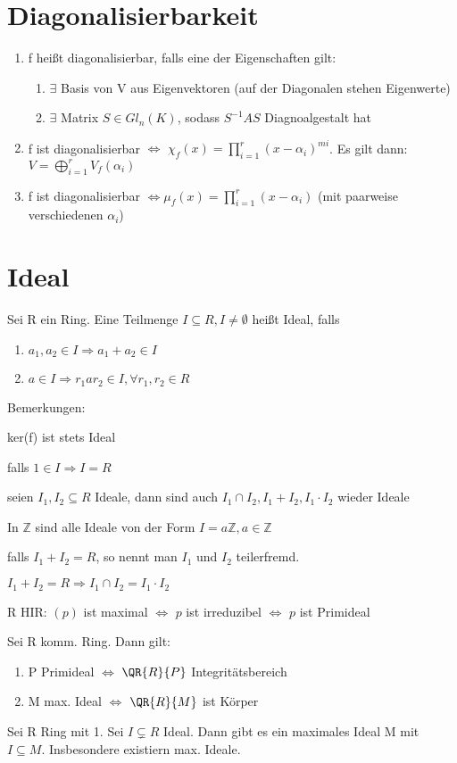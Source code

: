 \section{Diagonalisierbarkeit}
\begin{enumerate}
	\item f heißt diagonalisierbar, falls eine der Eigenschaften gilt:
	\begin{enumerate}
		\item $\exists$ Basis von V aus Eigenvektoren (auf der Diagonalen stehen Eigenwerte)
		\item $\exists$ Matrix $S \in Gl_n(K)$, sodass $S^{-1}AS$ Diagnoalgestalt hat
	\end{enumerate}
	\item f ist diagonalisierbar $\Leftrightarrow$ $\chi_f(x) = \prod \limits_{i=1}^{r} (x- \alpha_i)^{mi}$. Es gilt dann: $V=\bigoplus \limits_{i=1}^r V_f(\alpha_i)$
	\item f ist diagonalisierbar $\Leftrightarrow \mu_f(x) = \prod \limits_{i=1}^{r}(x-\alpha_i)$ (mit paarweise verschiedenen $\alpha_i$) 
\end{enumerate}

\section{Ideal}
Sei R ein Ring. Eine Teilmenge $I \subseteq R, I \neq \emptyset$ heißt Ideal, falls
\begin{enumerate}
	\item $a_1,a_2 \in I \Rightarrow a_1+a_2 \in I$
	\item $a \in I \Rightarrow r_1 a r_2 \in I, \forall r_1,r_2 \in R$
\end{enumerate}
Bemerkungen:
\begin{compactitem}
	\item ker(f) ist stets Ideal
	\item falls $1 \in I \Rightarrow I = R$
	\item seien $I_1,I_2 \subseteq R$ Ideale, dann sind auch $I_1 \cap I_2, I_1+I_2, I_1 \cdot I_2$ wieder Ideale
	\item In $\mathbb{Z}$ sind alle Ideale von der Form $I=a\mathbb{Z}, a \in \mathbb{Z}$
	\item falls $I_1+I_2 = R$, so nennt man $I_1$ und $I_2$ teilerfremd.
	\item $I_1+I_2 = R \Rightarrow I_1 \cap I_2 = I_1 \cdot I_2$
	\item R HIR: $(p)$ ist maximal $ \Leftrightarrow $ $p$ ist irreduzibel $\Leftrightarrow$ $p$ ist Primideal
	\item Sei R komm. Ring. Dann gilt:
	\begin{enumerate}
		\item P Primideal $\Leftrightarrow$ $\QR{R}{P}$ Integritätsbereich
		\item M max. Ideal $\Leftrightarrow$ $\QR{R}{M}$ ist Körper
	\end{enumerate}
	\item Sei R Ring mit 1. Sei $I \subsetneq R $ Ideal. Dann gibt es ein maximales Ideal M mit $ I \subseteq M$. Insbesondere existiern max. Ideale.
\end{compactitem}

